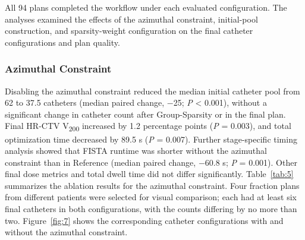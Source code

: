 \documentclass[12pt,twoside,letterpaper]{article}
\begin{document}
All 94 plans completed the workflow under each evaluated configuration. The analyses examined the effects of the azimuthal constraint, initial-pool construction, and sparsity-weight configuration on the final catheter configurations and plan quality.

\subsubsection{Azimuthal Constraint}\label{sec:3-3-1}

Disabling the azimuthal constraint reduced the median initial catheter pool from 62 to 37.5 catheters (median paired change, \ensuremath{-}25; \emph{P} < 0.001), without a significant change in catheter count after Group-Sparsity or in the final plan. Final HR-CTV V\textsubscript{200} increased by 1.2 percentage points (\emph{P} = 0.003), and total optimization time decreased by 89.5 s (\emph{P} = 0.007). Further stage-specific timing analysis showed that FISTA runtime was shorter without the azimuthal constraint than in Reference (median paired change, \ensuremath{-}60.8 s; \emph{P} = 0.001). Other final dose metrics and total dwell time did not differ significantly. Table~\ref{tab:5} summarizes the ablation results for the azimuthal constraint. Four fraction plans from different patients were selected for visual comparison; each had at least six final catheters in both configurations, with the counts differing by no more than two. Figure~\ref{fig:7} shows the corresponding catheter configurations with and without the azimuthal constraint.
\end{document}
